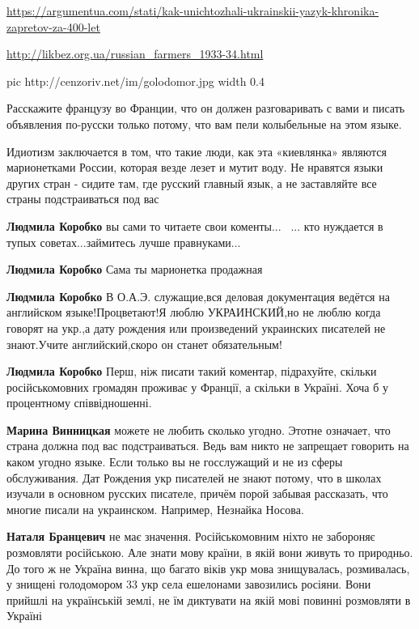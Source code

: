 \begin{itemize}
\begin{itemize}

\url{https://argumentua.com/stati/kak-unichtozhali-ukrainskii-yazyk-khronika-zapretov-za-400-let}\par
\url{http://likbez.org.ua/russian_farmers_1933-34.html}\par

\ifcmt
	pic http://cenzoriv.net/im/golodomor.jpg
  width 0.4
\fi

\end{itemize}


Расскажите французу во Франции, что он должен разговаривать с вами и писать
объявления по-русски только потому, что вам пели колыбельные на этом языке.

Идиотизм заключается в том, что такие люди, как эта «киевлянка» являются
марионетками России, которая везде лезет и мутит воду. Не нравятся языки других
стран - сидите там, где русский главный язык, а не заставляйте все страны
подстраиваться под вас

\begin{itemize}

\textbf{Людмила Коробко} вы сами то читаете свои коменты...🤣🤣🤣... кто нуждается в
тупых советах...займитесь лучше правнуками...

\textbf{Людмила Коробко} Сама ты марионетка продажная

\textbf{Людмила Коробко} В О.А.Э. служащие,вся деловая документация ведётся на
английском языке!Процветают!Я люблю УКРАИНСКИЙ,но не люблю когда говорят на
укр.,а дату рождения или произведений украинских писателей не знают.Учите
английский,скоро он станет обязательным!

\textbf{Людмила Коробко} Перш, ніж писати такий коментар, підрахуйте, скільки
російськомовних громадян проживає у Франції, а скільки в Україні. Хоча б у
процентному співвідношенні.

\textbf{Марина Винницкая} можете не любить сколько угодно. Этотне означает, что
страна должна под вас подстраиваться. Ведь вам никто не запрещает говорить на
каком угодно языке. Если только вы не госслужащий и не из сферы обслуживания.
Дат Рождения укр писателей не знают потому, что в школах изучали в основном
русских писателе, причём порой забывая рассказать, что многие писали на
украинском. Например, Незнайка Носова.

\textbf{Наталя Бранцевич} не має значення. Російськомовним ніхто не забороняє
розмовляти російською. Але знати мову країни, в якій вони живуть то природньо.
До того ж не Україна винна, що багато віків укр мова знищувалась, розмивалась,
у знищені голодомором 33 укр села ешелонами завозились росіяни. Вони прийшлі на
українській землі, не їм диктувати на якій мові повинні розмовляти в Україні


\end{itemize}
\end{itemize}
